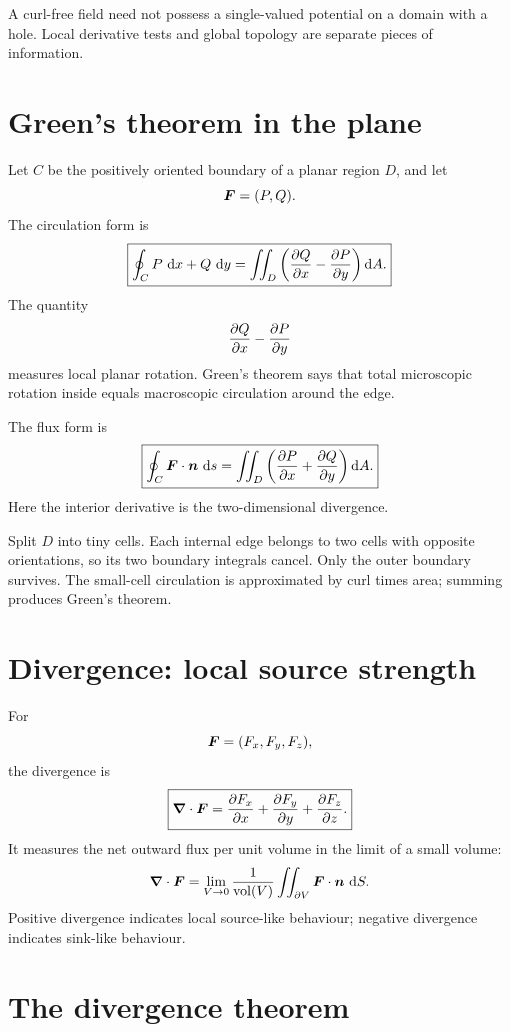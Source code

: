 \documentclass[11pt,a4paper]{article}
\begin{document}
\begin{warningbox}
A curl-free field need not possess a single-valued potential on a domain with a hole. Local derivative tests and global topology are separate pieces of information.
\end{warningbox}

\section{Green's theorem in the plane}

Let $C$ be the positively oriented boundary of a planar region $D$, and let
\[
\bm{F}=(P,Q).
\]
The circulation form is
\[
\boxed{
\oint_C P\,\mathop{}\!\mathrm d x+Q\,\mathop{}\!\mathrm d y
=\iint_D\left(\frac{\partial Q}{\partial x}-\frac{\partial P}{\partial y}\right)\mathop{}\!\mathrm d A.}
\]
The quantity
\[
\frac{\partial Q}{\partial x}-\frac{\partial P}{\partial y}
\]
measures local planar rotation. Green's theorem says that total microscopic rotation inside equals macroscopic circulation around the edge.

The flux form is
\[
\boxed{
\oint_C\bm{F}\cdot\bm{n}\,\mathop{}\!\mathrm d s
=\iint_D\left(\frac{\partial P}{\partial x}+\frac{\partial Q}{\partial y}\right)\mathop{}\!\mathrm d A.}
\]
Here the interior derivative is the two-dimensional divergence.

\begin{intuition}
Split $D$ into tiny cells. Each internal edge belongs to two cells with opposite orientations, so its two boundary integrals cancel. Only the outer boundary survives. The small-cell circulation is approximated by curl times area; summing produces Green's theorem.
\end{intuition}

\section{Divergence: local source strength}

For
\[
\bm{F}=(F_x,F_y,F_z),
\]
the divergence is
\[
\boxed{\boldsymbol\nabla\cdot\bm{F}
=\frac{\partial F_x}{\partial x}+\frac{\partial F_y}{\partial y}+\frac{\partial F_z}{\partial z}.}
\]
It measures the net outward flux per unit volume in the limit of a small volume:
\[
\boldsymbol\nabla\cdot\bm{F}
=\lim_{V\to0}\frac{1}{\operatorname{vol}(V)}
\iint_{\partial V}\bm{F}\cdot\bm{n}\,\mathop{}\!\mathrm d S.
\]
Positive divergence indicates local source-like behaviour; negative divergence indicates sink-like behaviour.

\section{The divergence theorem}
\end{document}

